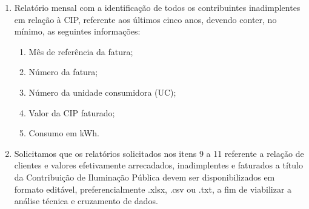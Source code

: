\begin{enumerate}[resume]
\item Relatório mensal com a identificação de todos os contribuintes inadimplentes em relação à CIP, referente aos últimos cinco anos, devendo conter, no mínimo, as seguintes informações:
\begin{enumerate}[resume]
  \item Mês de referência da fatura;
  \item Número da fatura;
  \item Número da unidade consumidora (UC);
  \item Valor da CIP faturado;
  \item Consumo em kWh.
\end{enumerate}

\item Solicitamos que os relatórios solicitados nos itens 9 a 11 referente a relação de clientes e valores efetivamente arrecadados, inadimplentes e faturados a título da Contribuição de Iluminação Pública devem ser disponibilizados em formato editável, preferencialmente .xlsx, .csv ou .txt, a fim de viabilizar a análise técnica e cruzamento de dados.
\end{enumerate}

